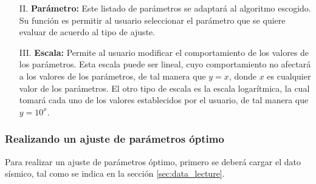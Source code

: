 \documentclass[12pt,twoside,letter]{ol-softwaremanual}
\begin{document}
\begin{itemize}[leftmargin=0.5in]
	\setlength\itemsep{0em} 
	
	\item[II.] \textbf{Parámetro:} Este listado de parámetros se adaptará al algoritmo escogido. Su función es permitir al usuario seleccionar el parámetro que se quiere evaluar de acuerdo al tipo de ajuste.       
    
    \item[III.] \textbf{Escala:} Permite al usuario modificar el comportamiento de los valores de los parámetros. Esta escala puede ser lineal, cuyo comportamiento no afectará a los valores de los parámetros, de tal manera que $y = x$, donde $x$ es cualquier valor de los parámetros. El otro tipo de escala es la escala logarítmica, la cual tomará cada uno de los valores establecidos por el usuario, de tal manera que $y = 10^x$.
    
\end{itemize}

\subsubsection*{Realizando un ajuste de parámetros óptimo}

Para realizar un ajuste de parámetros óptimo, primero se deberá cargar el dato sísmico, tal como se indica en la sección \ref{sec:data_lecture}.
\end{document}
